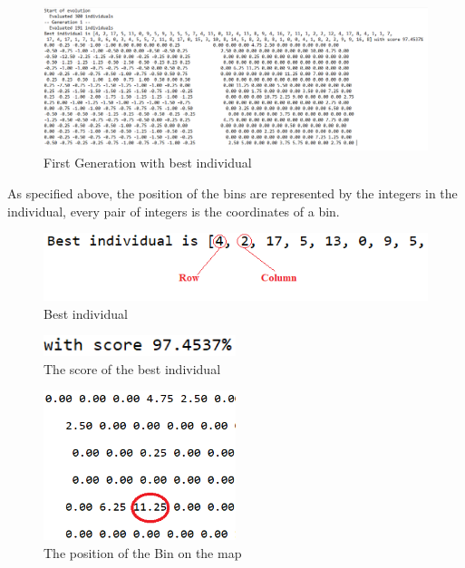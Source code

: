 \documentclass[a4paper,12pt]{report}
\begin{document}
\begin{figure}[H]
    \centering
    \includegraphics[width=1\textwidth]{fig/results1}
    \caption{First Generation with best individual}
    \label{fig:results1}
\end{figure}

As specified above, the position of the bins are represented by the integers in the individual, every pair of integers is the coordinates of a bin.

\begin{figure}[H]
    \centering
    \includegraphics[width=1\textwidth]{fig/best1}
    \caption{Best individual}
    \label{fig:best1}
\end{figure}

\begin{figure}[H]
    \centering
    \includegraphics[width=0.5\textwidth]{fig/score}
    \caption{The score of the best individual}
    \label{fig:score}
\end{figure}
\begin{figure}[H]
    \centering
    \includegraphics[width=0.5\textwidth]{fig/position1}
    \caption{The position of the Bin on the map}
    \label{fig:position1}
\end{figure}
\end{document}
